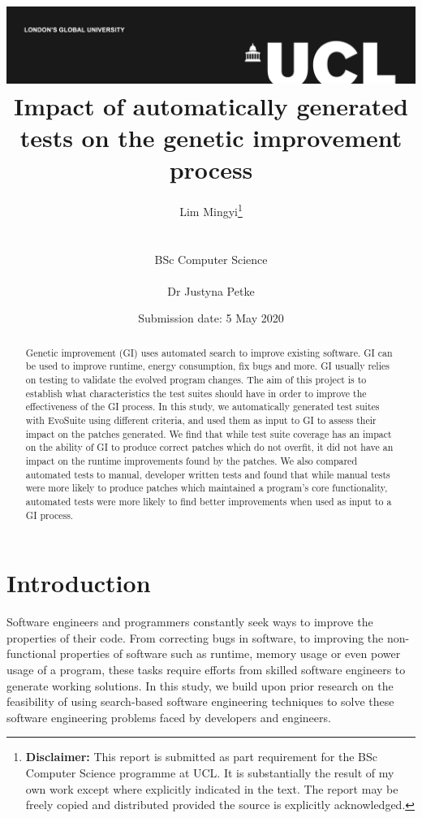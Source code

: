 \documentclass[titlepage]{article}
\title{{\vspace{-14em} \includegraphics[scale=0.4]{ucl_logo.png}}\\
{{\Huge Impact of automatically generated tests on the genetic improvement process}}\\

}
\date{Submission date: 5 May 2020}
\author{Lim Mingyi\thanks{
{\bf Disclaimer:}
This report is submitted as part requirement for the BSc Computer Science programme at UCL. It is
substantially the result of my own work except where explicitly indicated in the text. The report may be freely copied and distributed provided the source is explicitly acknowledged.}

\\ \\

BSc Computer Science\\ \\
Dr Justyna Petke}
\begin{document}
 
\onehalfspacing
\maketitle

\vfill
\pagebreak

\begin{abstract}
Genetic improvement (GI) uses automated search to improve existing software. GI can be used to improve runtime, energy consumption, fix bugs and more. GI usually relies on testing to validate the evolved program changes. The aim of this project is to establish what characteristics the test suites should have in order to improve the effectiveness of the GI process. In this study, we automatically generated test suites with EvoSuite using different criteria, and used them as input to GI to assess their impact on the patches generated. We find that while test suite coverage has an impact on the ability of GI to produce correct patches which do not overfit, it did not have an impact on the runtime improvements found by the patches. We also compared automated tests to manual, developer written tests and found that while manual tests were more likely to produce patches which maintained a program’s core functionality, automated tests were more likely to find better improvements when used as input to a GI process.

\end{abstract}
\vfill
\pagebreak

\tableofcontents
\setcounter{page}{1}
\pagebreak

\section{Introduction}
Software engineers and programmers constantly seek ways to improve the properties of their code. From correcting bugs in software, to improving the non-functional properties of software such as runtime, memory usage or even power usage of a program, these tasks require efforts from skilled software engineers to generate working solutions. In this study, we build upon prior research on the feasibility of using search-based software engineering techniques to solve these software engineering problems faced by developers and engineers.
\end{document}
